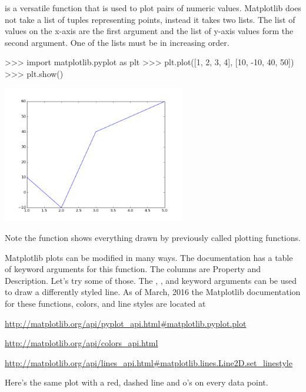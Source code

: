 \documentclass[11pt]{cselabheader}
\begin{document}
 is a versatile function that is used to plot
pairs of numeric values. Matplotlib does not take a list of tuples
representing points, instead it takes two lists. The list of values on
the x-axis are the first argument and the list of y-axis values form
the second argument. One of the lists must be in increasing order.

\begin{pyconcode}
>>> import matplotlib.pyplot as plt
>>> plt.plot([1, 2, 3, 4], [10, -10, 40, 50])
>>> plt.show()
\end{pyconcode}

\begin{center}
\includegraphics[width=0.6\textwidth]{img/matplotlib_plot1.png}
\end{center}

Note the  function shows everything drawn by
previously called plotting functions.

Matplotlib plots can be modified in many ways. The documentation has a
table of keyword arguments for this function. The columns are Property
and Description.  Let's try some of those. The ,
, and  keyword arguments
can be used to draw a differently styled line.  As of March, 2016 the
Matplotlib documentation for these functions, colors, and line styles
are located at

\begin{center}
\url{http://matplotlib.org/api/pyplot_api.html#matplotlib.pyplot.plot}

\url{http://matplotlib.org/api/colors_api.html}

\url{http://matplotlib.org/api/lines_api.html#matplotlib.lines.Line2D.set_linestyle}
\end{center}

Here's the same plot with a red, dashed line and o's on every data point.
\end{document}
